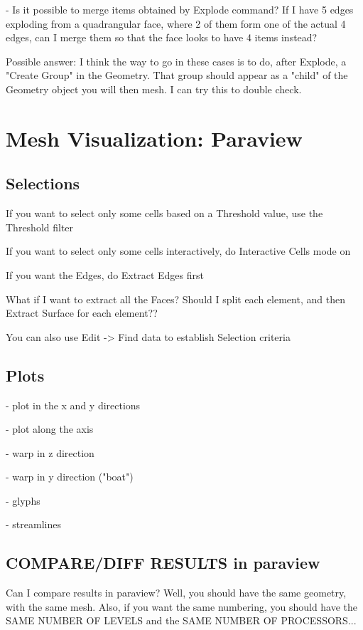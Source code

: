 \documentclass[10pt]{book}
\begin{document}
- Is it possible to merge items obtained by Explode command? If I have 5 edges exploding from a quadrangular face,
  where 2 of them form one of the actual 4 edges, can I merge them so that the face looks to have 4 items instead?
    
  Possible answer: I think the way to go in these cases is to do, after Explode, a "Create Group" in the Geometry.
    That group should appear as a "child" of the Geometry object you will then mesh. I can try this to double check.


\part{Mesh Visualization: Paraview}


\chapter{Selections}


 If you want to select only some cells based on a Threshold value, use the Threshold filter

 If you want to select only some cells interactively, do Interactive Cells mode on
 
 If you want the Edges, do Extract Edges first
 
 What if I want to extract all the Faces? 
   Should I split each element, and then Extract Surface for each element??

 You can also use Edit -> Find data to establish Selection criteria
 
 
 \chapter{Plots}
 
- plot in the x and y directions

- plot along the axis

- warp in z direction

- warp in y direction ("boat")

- glyphs

- streamlines


\chapter{COMPARE/DIFF RESULTS  in paraview}

Can I compare results in paraview?
Well, you should have the same geometry, with the same mesh.
Also, if you want the same numbering,
you should have the SAME NUMBER OF LEVELS 
and the SAME NUMBER OF PROCESSORS...
\end{document}
